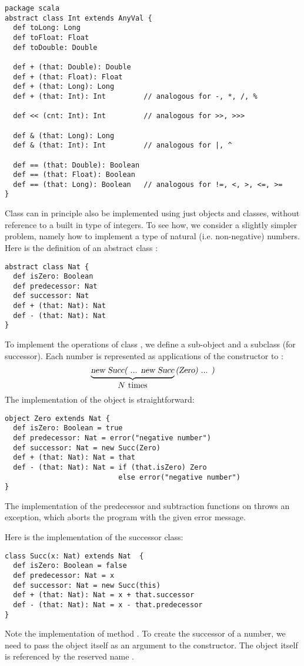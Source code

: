 \begin{lstlisting}
package scala
abstract class Int extends AnyVal {
  def toLong: Long
  def toFloat: Float
  def toDouble: Double

  def + (that: Double): Double
  def + (that: Float): Float
  def + (that: Long): Long
  def + (that: Int): Int         // analogous for -, *, /, %

  def << (cnt: Int): Int         // analogous for >>, >>>

  def & (that: Long): Long
  def & (that: Int): Int         // analogous for |, ^

  def == (that: Double): Boolean
  def == (that: Float): Boolean
  def == (that: Long): Boolean   // analogous for !=, <, >, <=, >=
}
\end{lstlisting}

Class  can in principle also be implemented using just
objects and classes, without reference to a built in type of
integers. To see how, we consider a slightly simpler problem, namely
how to implement a type  of natural (i.e. non-negative)
numbers. Here is the definition of an abstract class :
\begin{lstlisting}
abstract class Nat {
  def isZero: Boolean
  def predecessor: Nat
  def successor: Nat
  def + (that: Nat): Nat
  def - (that: Nat): Nat
}
\end{lstlisting}
To implement the operations of class , we define a sub-object
 and a subclass  (for successor). Each number
 is represented as  applications of the 
constructor to :
\[
\underbrace{\mbox{\sl new Succ( ... new Succ}}_{\mbox{$N$ times}}\mbox{\sl (Zero) ... )}
\]
The implementation of the  object is straightforward:
\begin{lstlisting}
object Zero extends Nat {
  def isZero: Boolean = true
  def predecessor: Nat = error("negative number")
  def successor: Nat = new Succ(Zero)
  def + (that: Nat): Nat = that
  def - (that: Nat): Nat = if (that.isZero) Zero
                           else error("negative number")
}
\end{lstlisting}

The implementation of the predecessor and subtraction functions on
 throws an  exception, which aborts the program
with the given error message.

Here is the implementation of the successor class:
\begin{lstlisting}
class Succ(x: Nat) extends Nat  {
  def isZero: Boolean = false
  def predecessor: Nat = x
  def successor: Nat = new Succ(this)
  def + (that: Nat): Nat = x + that.successor
  def - (that: Nat): Nat = x - that.predecessor
}
\end{lstlisting}
Note the implementation of method . To create the
successor of a number, we need to pass the object itself as an
argument to the  constructor.  The object itself is
referenced by the reserved name .   

